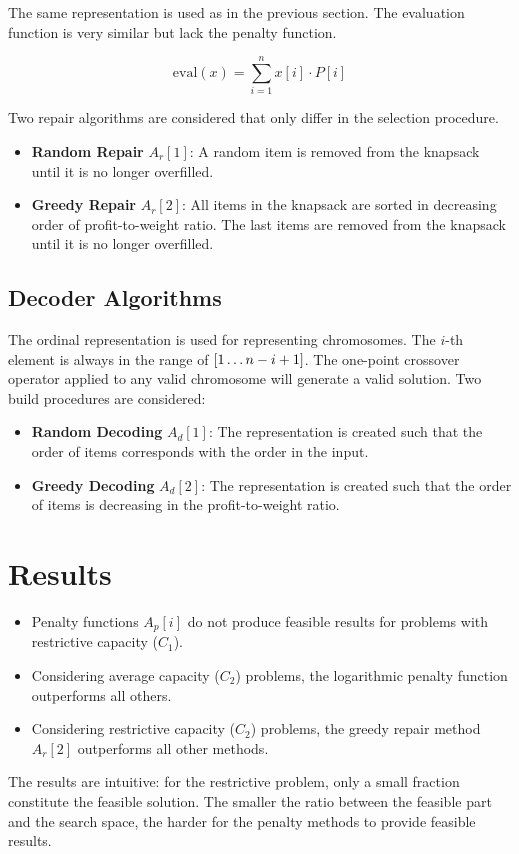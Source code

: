 \documentclass[../main.tex]{subfiles}
\begin{document}
The same representation is used as in the previous section. The evaluation function is very similar but lack the
penalty function.

\begin{equation}
\text{eval}(x) = \sum^n_{i=1} x[i] \cdot P[i]
\end{equation}

Two repair algorithms are considered that only differ in the selection procedure.

\begin{itemize}
	\item \textbf{Random Repair} $A_r[1]$: A random item is removed from the knapsack until it is no longer overfilled.
	\item \textbf{Greedy Repair} $A_r[2]$: All items in the knapsack are sorted in decreasing order of profit-to-weight
	ratio. The last items are removed from the knapsack until it is no longer overfilled.
\end{itemize}

\subsection{Decoder Algorithms}

The ordinal representation is used for representing chromosomes. The $i$-th element is always in the range of $[1
\mathellipsis n - i + 1]$. The one-point crossover operator applied to any valid chromosome will generate a valid
solution. Two build procedures are considered:

\begin{itemize}
	\item \textbf{Random Decoding} $A_d[1]$: The representation is created such that the order of items corresponds
	with the order in the input.
	\item \textbf{Greedy Decoding} $A_d[2]$: The representation is created such that the order of items is decreasing
	in the profit-to-weight ratio.
\end{itemize}

\section{Results}

\begin{itemize}
	\item Penalty functions $A_p[i]$ do not produce feasible results for problems with restrictive capacity ($C_1$).
	\item Considering average capacity ($C_2$) problems, the logarithmic penalty function outperforms all others.
	\item Considering restrictive capacity ($C_2$) problems, the greedy repair method $A_r[2]$ outperforms all other
	methods.
\end{itemize}

The results are intuitive: for the restrictive problem, only a small fraction constitute the feasible solution. The
smaller the ratio between the feasible part and the search space, the harder for the penalty methods to provide
feasible results.
\end{document}
